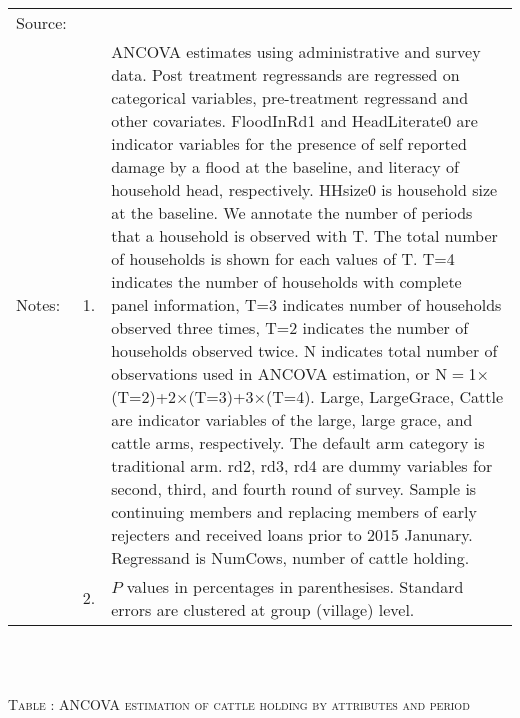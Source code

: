 \begin{minipage}[t]{14cm}
  \setlength{\baselineskip}{8pt}
  \renewcommand{\arraystretch}{.55}
  \hfil{}\\
\renewcommand{\arraystretch}{.8}
\setlength{\tabcolsep}{1pt} \begin{tabular}{>{\hfill\scriptsize}p{1cm}<{}>{\hfill\scriptsize}p{.25cm}<{}>{\scriptsize}p{12cm}<{\hfill}} 
Source:& \multicolumn{2}{l}{\scriptsize Estimated with GUK administrative and survey data.}\\
Notes: & 1. & ANCOVA estimates using administrative and survey data. Post treatment regressands are regressed on categorical variables, pre-treatment regressand and other covariates. \textsf{FloodInRd1} and \textsf{HeadLiterate0} are indicator variables for the presence of self reported damage by a flood at the baseline, and literacy of household head, respectively. \textsf{HHsize0} is household size at the baseline. We annotate the number of periods that a household is observed with \textsf{T}. The total number of households is shown for each values of \textsf{T}. \textsf{T=4} indicates the number of households with complete panel information, \textsf{T=3} indicates number of households observed three times, \textsf{T=2} indicates the number of households observed twice. \textsf{N} indicates total number of observations used in ANCOVA estimation, or \textsf{N$=$1$\times$(T=2)+2$\times$(T=3)+3$\times$(T=4)}.  \textsf{Large}, \textsf{LargeGrace}, \textsf{Cattle} are indicator variables of the \textsf{large}, \textsf{large grace}, and \textsf{cattle} arms, respectively. The default arm category is \textsf{traditional} arm. \textsf{rd2, rd3, rd4} are dummy variables for second, third, and fourth round of survey. Sample is continuing members and replacing members of early rejecters and received loans prior to 2015 Janunary. Regressand is \textsf{NumCows}, number of cattle holding. \\
& 2. & $P$ values in percentages in parenthesises. Standard errors are clustered at group (village) level. %
 \end{tabular}
\end{minipage} \\\\\hspace{-1cm}\begin{minipage}[t]{14cm} \hfil\textsc{\normalsize Table \thetable: ANCOVA estimation of cattle holding by attributes and period\label{tab ANCOVA cow time varying attributes}}\\ \setlength{\tabcolsep}{1pt}

\end{minipage}

